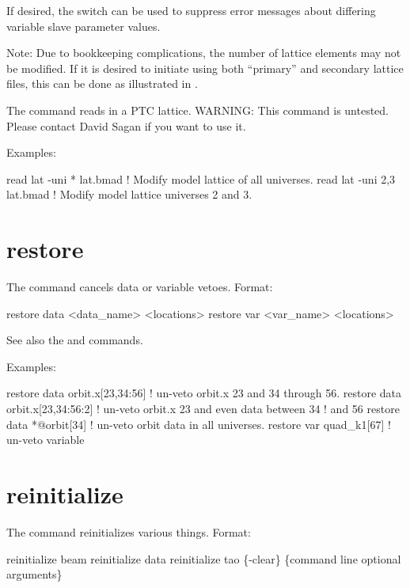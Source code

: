 If desired, the  switch can be used to suppress error messages about differing \tao
variable slave parameter values.

Note: Due to bookkeeping complications, the number of lattice elements may not be modified. If it is
desired to initiate \tao using both ``primary'' and secondary lattice files, this can be done as
illustrated in .

The  command reads in a PTC lattice. WARNING: This command is untested. Please contact
David Sagan if you want to use it.

Examples:
\begin{example}
  read lat -uni * lat.bmad   ! Modify model lattice of all universes.
  read lat -uni 2,3 lat.bmad ! Modify model lattice universes 2 and 3.
\end{example}

\section{restore}
\label{s:restore}

The  command cancels data or variable vetoes. Format:
\begin{example}
  restore data  <data_name> <locations>
  restore var <var_name> <locations>
\end{example}

\vskip 10pt 

See also the  and  commands.

Examples:
\begin{example}
  restore data orbit.x[23,34:56]   ! un-veto orbit.x 23 and 34 through 56.
  restore data orbit.x[23,34:56:2] ! un-veto orbit.x 23 and even data between 34 
                                   !                                          and 56
  restore data *@orbit[34]         ! un-veto orbit data in all universes.
  restore var quad_k1[67]          ! un-veto variable
\end{example}

\section{reinitialize}
\label{s:reinit}

The  command reinitializes various things. Format:
\begin{example}
  reinitialize beam
  reinitialize data
  reinitialize tao \{-clear\} \{command line optional arguments\}
\end{example}


